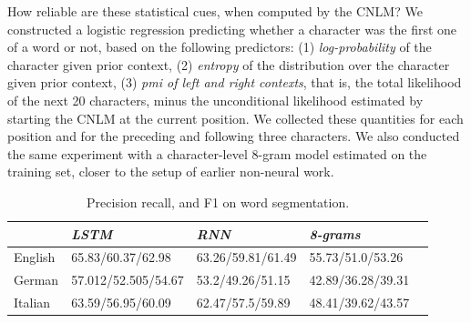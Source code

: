 How reliable are these statistical cues, when computed by the CNLM?
We constructed a logistic regression predicting whether a character was the first one of a word or not, based on the following predictors:
(1) \emph{log-probability} of the character given prior context, (2) \emph{entropy} of the distribution over the character given prior context, (3) \emph{pmi of left and right contexts}, that is, the total likelihood of the next 20 characters, minus the unconditional likelihood estimated by starting the CNLM at the current position.
We collected these quantities for each position and for the preceding and following three characters.
We also conducted the same experiment with a character-level 8-gram model estimated on the training set, closer to the setup of earlier non-neural work.


\begin{table}[t]
  \begin{center}
    \begin{tabular}{l|l|l|l|l}
      \multicolumn{1}{c}{}&\emph{LSTM}&\emph{RNN}&\emph{8-grams}\\
      \hline
      English & 65.83/60.37/62.98 &   63.26/59.81/61.49 & 55.73/51.0/53.26    \\ %
      German &  57.012/52.505/54.67 &  53.2/49.26/51.15 & 42.89/36.28/39.31   \\ %
      Italian &  63.59/56.95/60.09 & 62.47/57.5/59.89  & 48.41/39.62/43.57    \\ %
    \end{tabular}
  \end{center}
  \caption{\label{tab:segmentation-results} Precision recall, and F1 on word segmentation.}
\end{table}

